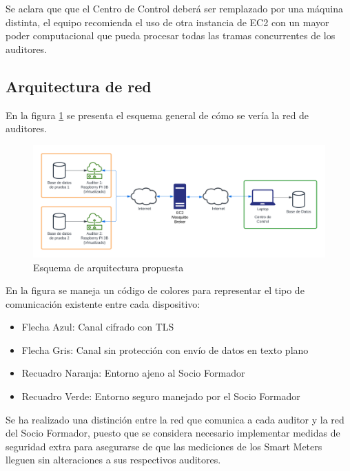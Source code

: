 \documentclass{article}
\begin{document}
            Se aclara que que el Centro de Control deberá ser remplazado por una máquina distinta, el equipo recomienda el uso de otra instancia de EC2 con un mayor poder computacional que pueda procesar todas las tramas concurrentes de los auditores.

        \subsection{Arquitectura de red}

            En la figura \ref{fig:proposed_architecture} se presenta el esquema general de cómo se vería la red de auditores.
            \begin{figure}[htbp]
                \centering
                \includegraphics[scale=0.7]{proposed_architecture.png}
                \caption{Esquema de arquitectura propuesta}
                \label{fig:proposed_architecture}
            \end{figure}

            En la figura se maneja un código de colores para representar el tipo de comunicación existente entre cada dispositivo:
            \begin{itemize}[noitemsep, leftmargin=*]
                \item Flecha Azul: Canal cifrado con TLS
                \item Flecha Gris: Canal sin protección con envío de datos en texto plano
                \item Recuadro Naranja: Entorno ajeno al Socio Formador
                \item Recuadro Verde: Entorno seguro manejado por el Socio Formador
            \end{itemize}

            Se ha realizado una distinción entre la red que comunica a cada auditor y la red del Socio Formador, puesto que se considera necesario implementar medidas de seguridad extra para asegurarse de que las mediciones de los Smart Meters lleguen sin alteraciones a sus respectivos auditores.
\end{document}

